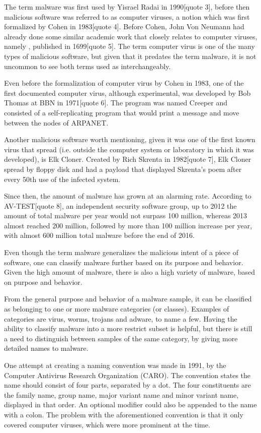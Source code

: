 \documentclass{llncs}
\begin{document}
The term malware was first used by Yisrael Radai in 1990[quote 3], before then malicious software was referred to as computer viruses, a notion which was first formalized by Cohen in 1983[quote 4]. Before Cohen, John Von Neumann had already done some similar academic work that closely relates to computer viruses, namely , published in 1699[quote 5]. The term computer virus is one of the many types of malicious software, but given that it predates the term malware, it is not uncommon to see both terms used as interchangeably.

Even before the formalization of computer virus by Cohen in 1983, one of the first documented computer virus, although experimental, was developed by Bob Thomas at BBN in 1971[quote 6]. The program was named Creeper and consisted of a self-replicating program that would print a message and move between the nodes of ARPANET.

Another malicious software worth mentioning, given it was one of the first known virus that spread  (i.e. outside the computer system or laboratory in which it was developed), is Elk Cloner. Created by Rich Skrenta in 1982[quote 7], Elk Cloner spread by floppy disk and had a payload that displayed Skrenta's poem after every 50th use of the infected system.

Since then, the amount of malware has grown at an alarming rate. According to AV-TEST[quote 8], an independent security software group, up to 2012 the amount of total malware per year would not surpass 100 million, whereas 2013 almost reached 200 million, followed by more than 100 million increase per year, with almost 600 million total malware before the end of 2016.


Even though the term malware generalizes the malicious intent of a piece of software, one can classify malware further based on its purpose and behavior. Given the high amount of malware, there is also a high variety of malware, based on purpose and behavior.

From the general purpose and behavior of a malware sample, it can be classified as belonging to one or more malware categories (or classes). Examples of categories are virus, worms, trojans and adware, to name a few. Having the ability to classify malware into a more restrict subset is helpful, but there is still a need to distinguish between samples of the same category, by giving more detailed names to malware.

One attempt at creating a naming convention was made in 1991, by the Computer Antivirus Research Organization (CARO). The convention states the name should consist of four parts, separated by a dot. The four constituents are the family name, group name, major variant name and minor variant name, displayed in that order. An optional modifier could also be appended to the name with a colon. The problem with the aforementioned convention is that it only covered computer viruses, which were more prominent at the time.
\end{document}
